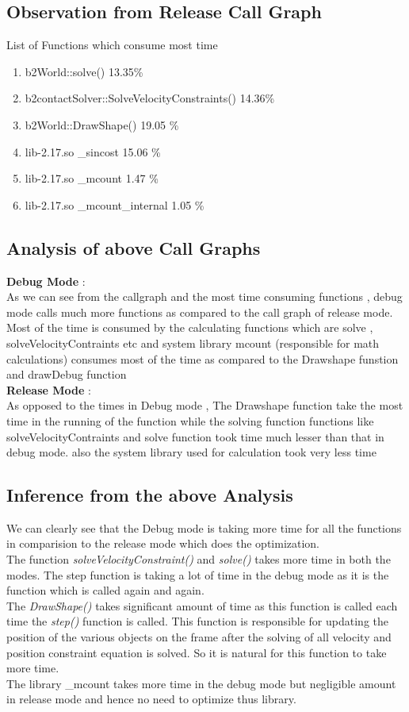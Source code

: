 \documentclass[11pt,]{article}
\begin{document}
\begin{singlespace}
\subsection*{Observation from Release Call Graph}
List of Functions which consume most time
\begin{enumerate}
    \item b2World::solve() 13.35\%
    \item b2contactSolver::SolveVelocityConstraints() 14.36\%
    \item b2World::DrawShape() 19.05 \%
    \item lib-2.17.so \_sincost 15.06 \%
    \item lib-2.17.so \_mcount 1.47 \%
    \item lib-2.17.so \_mcount\_internal 1.05 \%
\end{enumerate}

\subsection{Analysis of above Call Graphs}
\textbf{Debug Mode} :\\
As we can see from the callgraph and the most time consuming functions , debug mode calls much more functions as compared to the call graph of release mode.
Most of the time is consumed by the calculating functions which are solve , solveVelocityContraints etc and system library mcount (responsible for math calculations)
 consumes most of the time as compared to the Drawshape funstion and drawDebug function\\
\textbf{Release Mode} :\\
As opposed to the times in Debug mode , The Drawshape function take the most time in the running of the function while the solving function functions like
solveVelocityContraints and solve function took time much lesser than that in debug mode. also the system library used for calculation took very less
time 

\subsection{Inference from the above Analysis}
We can clearly see that the Debug mode is taking more time for all the functions in comparision to the release mode which does the optimization.\\
The function \emph{solveVelocityConstraint()} and \emph{solve()} takes more time in both the modes.
The step function is taking a lot of time in the debug mode as it is the function which is called again and again. \\
The \emph{DrawShape()} takes significant amount of time as this function is called each time the \emph{step()} function is called.
This function is responsible for updating the position of the various objects on the frame after the solving of all velocity and position 
constraint equation is solved. So it is natural for this function to take more time. \\
The library \_mcount takes more time in the debug mode but negligible amount in release mode and hence no need to optimize thus library.\\


\end{singlespace}
\end{document}
